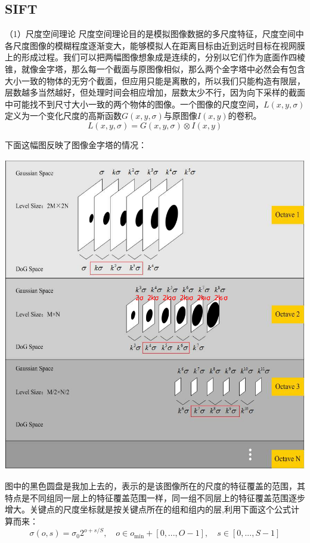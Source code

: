 \subsection{SIFT}

（1）尺度空间理论
尺度空间理论目的是模拟图像数据的多尺度特征，尺度空间中各尺度图像的模糊程度逐渐变大，能够模拟人在距离目标由近到远时目标在视网膜上的形成过程。我们可以把两幅图像想象成是连续的，分别以它们作为底面作四棱锥，就像金字塔，那么每一个截面与原图像相似，那么两个金字塔中必然会有包含大小一致的物体的无穷个截面，但应用只能是离散的，所以我们只能构造有限层，层数越多当然越好，但处理时间会相应增加，层数太少不行，因为向下采样的截面中可能找不到尺寸大小一致的两个物体的图像。一个图像的尺度空间，\(L(x,y,\sigma)\)定义为一个变化尺度的高斯函数\(G(x,y,\sigma)\)与原图像\(I(x,y)\)的卷积。
\begin{equation}
  L(x,y,\sigma) = G(x,y,\sigma) \otimes I(x,y)
\end{equation}

下面这幅图反映了图像金字塔的情况：

\includegraphics[width=14.00cm]{imgs/ch2/DoG}

图中的黑色圆盘是我加上去的，表示的是该图像所在的尺度的特征覆盖的范围，其特点是不同组同一层上的特征覆盖范围一样，同一组不同层上的特征覆盖范围逐步增大。关键点的尺度坐标就是按关键点所在的组和组内的层,利用下面这个公式计算而来：
\begin{equation}
  \sigma(o,s) = \sigma_0 2^{o+s/S},
  \quad o \in o_{\min} + [0, ..., O-1],
  \quad s \in [0,...,S-1]
\end{equation}

